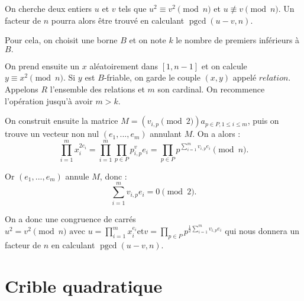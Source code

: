 \documentclass[french, 12pt, titlepage]{article}
\DeclareMathOperator{\pgcd}{pgcd}
\begin{document}
On cherche deux entiers $u$ et $v$ tels que $u^2 \equiv v^2 \pmod n$ et $u
\nequiv v \pmod n$. Un facteur de $n$ pourra alors être trouvé en calculant
$\pgcd(u - v, n).$

Pour cela, on choisit une borne $B$ et on note $k$ le nombre de
premiers inférieurs à $B.$ 

On prend ensuite un $x$ aléatoirement dans $[1, n - 1]$ et
on calcule $y \equiv x^2 \pmod n.$ Si $y$ est $B$-friable, on garde le
couple $(x, y)$ appelé $relation.$ Appelons $R$ l'ensemble des
relations et $m$ son cardinal. On recommence l'opération jusqu'à
avoir $m > k.$

On construit ensuite la matrice $M = (v_{i, p} \pmod 2)a_{p \in P, 1
  \leq i \leq m}$, puis on trouve un vecteur non nul $(e_1, ..., e_m)$
annulant $M.$
On a alors : \[\prod\limits_{i=1}^m x_i^{2e_i} = \prod\limits_{i=1}^m
\prod\limits_{p \in P} p^v_{i, p}e_i = \prod\limits_{p \in P}
p^{\sum\limits_{i=1}^m v_{i, p}e_i} \pmod n.\]

Or $(e_1, ..., e_m)$ annule $M$, donc : \[\sum\limits_{i=1}^m v_{i,
  p}e_i = 0 \pmod 2.\]

On a donc une congruence de carrés $u^2 = v^2 \pmod n \text{ avec } u =
\prod\limits_{i=1}^m x_i^{e_i} \text{et} v = \prod\limits_{p \in P}
p^{\frac{1}{2} \sum\limits_{i=1}^m v_{i, p}e_i}$ qui nous donnera un facteur
de $n$ en calculant $\pgcd(u - v, n).$


\section{Crible quadratique}
\end{document}
